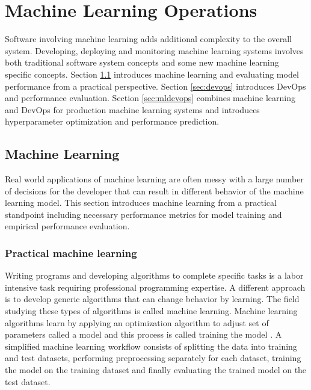 \chapter{Machine Learning Operations}
\label{chap:mloper}

Software involving machine learning adds additional complexity to the overall system. Developing, deploying and monitoring machine learning systems involves both traditional software system concepts and some new machine learning specific concepts. Section \ref{sec:ml} introduces machine learning and evaluating model performance from a practical perspective. Section \ref{sec:devops} introduces DevOps and performance evaluation. Section \ref{sec:mldevops} combines machine learning and DevOps for production machine learning systems and introduces hyperparameter optimization and performance prediction.

\section{Machine Learning} %
\label{sec:ml}
Real world applications of machine learning are often messy with a large number of decisions for the developer that can result in different behavior of the machine learning model. This section introduces machine learning from a practical standpoint including necessary performance metrics for model training and empirical performance evaluation.

\subsection{Practical machine learning}

Writing programs and developing algorithms to complete specific tasks is a labor intensive task requiring professional programming expertise.
A different approach is to develop generic algorithms that can change behavior by learning.
The field studying these types of algorithms is called machine learning.
Machine learning algorithms learn by applying an optimization algorithm to adjust set of parameters called a model and this process is called training the model \parencite{lecunDeepLearning2015}.
A simplified machine learning workflow consists of splitting the data into training and test datasets, performing preprocessing separately for each dataset, training the model on the training dataset and finally evaluating the trained model on the test dataset.  %


